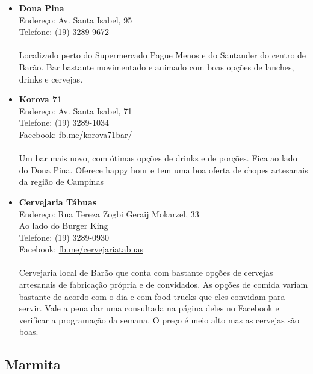 \begin{itemize}
\item \textbf{Dona Pina}
  \\Endereço: Av. Santa Isabel, 95
  \\Telefone: (19) 3289-9672
  \\
  \\Localizado perto do Supermercado Pague Menos e do Santander do centro de
  Barão. Bar bastante movimentado e animado com boas opções de lanches, drinks
  e cervejas.

\item \textbf{Korova 71}
  \\Endereço: Av. Santa Isabel, 71
  \\Telefone: (19) 3289-1034
  \\Facebook: \url{fb.me/korova71bar/}
  \\
  \\Um bar mais novo, com ótimas opções de drinks e de porções. Fica ao lado
  do Dona Pina. Oferece happy hour e tem uma boa oferta de chopes artesanais
  da região de Campinas

\item \textbf{Cervejaria Tábuas}
  \\Endereço: Rua Tereza Zogbi Geraij Mokarzel, 33
  \\Ao lado do Burger King
  \\Telefone: (19) 3289-0930
  \\Facebook: \url{fb.me/cervejariatabuas}
  \\
  \\Cervejaria local de Barão que conta com bastante opções de cervejas
  artesanais de fabricação própria e de convidados. As opções de comida variam
  bastante de acordo com o dia e com food trucks que eles convidam para servir.
  Vale a pena dar uma consultada na página deles no Facebook e verificar a
  programação da semana. O preço é meio alto mas as cervejas são boas.
\end{itemize}

\subsection{Marmita}

